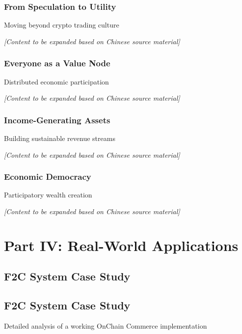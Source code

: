 \documentclass[
  Letterpaper,
]{scrbook}
\begin{document}
\section{From Speculation to Utility}\label{from-speculation-to-utility}

Moving beyond crypto trading culture

\emph{{[}Content to be expanded based on Chinese source material{]}}

\section{Everyone as a Value Node}\label{everyone-as-a-value-node}

Distributed economic participation

\emph{{[}Content to be expanded based on Chinese source material{]}}

\section{Income-Generating Assets}\label{income-generating-assets}

Building sustainable revenue streams

\emph{{[}Content to be expanded based on Chinese source material{]}}

\section{Economic Democracy}\label{economic-democracy}

Participatory wealth creation

\emph{{[}Content to be expanded based on Chinese source material{]}}

\part{Part IV: Real-World Applications}

\chapter{F2C System Case Study}\label{f2c-system-case-study}

\chapter{F2C System Case Study}\label{sec-f2c-case-study}

Detailed analysis of a working OnChain Commerce implementation
\end{document}
